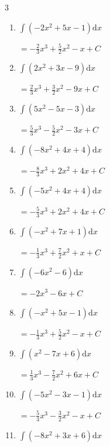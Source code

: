 \begin{multicols}{3}
\begin{enumerate}
  \item $\displaystyle \int \left( -2x^{2}+5x-1 \right) \mathrm{d}x$

        $\displaystyle =-\frac{2}{3}x^{3}+\frac{5}{2}x^{2}-x+ C$

  \item $\displaystyle \int \left( 2x^{2}+3x-9 \right) \mathrm{d}x$

        $\displaystyle =\frac{2}{3}x^{3}+\frac{3}{2}x^{2}-9x+ C$

  \item $\displaystyle \int \left( 5x^{2}-5x-3 \right) \mathrm{d}x$

        $\displaystyle =\frac{5}{3}x^{3}-\frac{5}{2}x^{2}-3x+ C$

  \item $\displaystyle \int \left( -8x^{2}+4x+4 \right) \mathrm{d}x$

        $\displaystyle =-\frac{8}{3}x^{3}+2x^{2}+4x+ C$

  \item $\displaystyle \int \left( -5x^{2}+4x+4 \right) \mathrm{d}x$

        $\displaystyle =-\frac{5}{3}x^{3}+2x^{2}+4x+ C$

  \item $\displaystyle \int \left( -x^{2}+7x+1 \right) \mathrm{d}x$

        $\displaystyle =-\frac{1}{3}x^{3}+\frac{7}{2}x^{2}+x+ C$

\columnbreak %

  \item $\displaystyle \int \left( -6x^{2}-6 \right) \mathrm{d}x$

        $\displaystyle =-2x^{3}-6x+ C$

  \item $\displaystyle \int \left( -x^{2}+5x-1 \right) \mathrm{d}x$

        $\displaystyle =-\frac{1}{3}x^{3}+\frac{5}{2}x^{2}-x+ C$

  \item $\displaystyle \int \left( x^{2}-7x+6 \right) \mathrm{d}x$

        $\displaystyle =\frac{1}{3}x^{3}-\frac{7}{2}x^{2}+6x+ C$

  \item $\displaystyle \int \left( -5x^{2}-3x-1 \right) \mathrm{d}x$

        $\displaystyle =-\frac{5}{3}x^{3}-\frac{3}{2}x^{2}-x+ C$

  \item $\displaystyle \int \left( -8x^{2}+3x+6 \right) \mathrm{d}x$


\end{enumerate}
\end{multicols}
